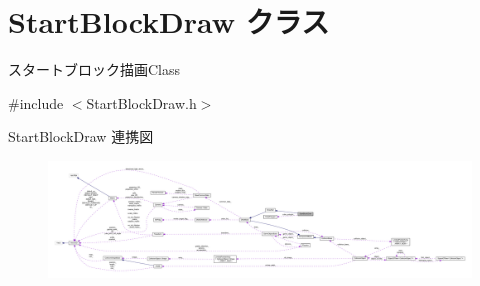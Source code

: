\hypertarget{class_start_block_draw}{}\section{Start\+Block\+Draw クラス}
\label{class_start_block_draw}


スタートブロック描画\+Class  




{\ttfamily \#include $<$Start\+Block\+Draw.\+h$>$}



Start\+Block\+Draw 連携図\nopagebreak
\begin{figure}[H]
\begin{center}
\leavevmode
\includegraphics[width=350pt]{class_start_block_draw__coll__graph}
\end{center}
\end{figure}
